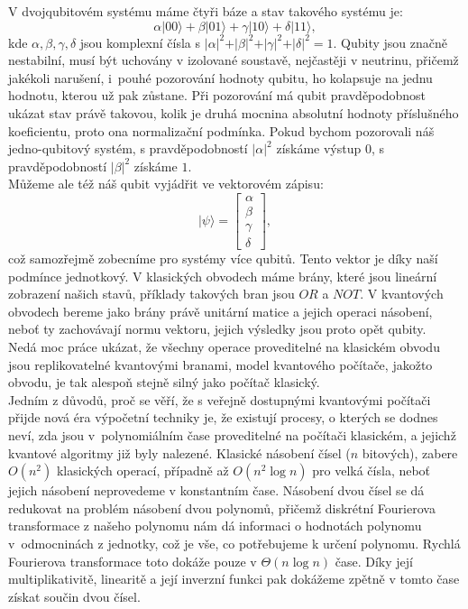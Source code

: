 \documentclass [12pt]{report}
\begin{document}
V dvojqubitovém systému máme čtyři báze a stav takového systému je:
\begin{equation*}
\alpha \vert 00 \rangle + \beta \vert 01 \rangle + \gamma \vert 10 \rangle + \delta \vert 11 \rangle, 
\end{equation*}
kde $\alpha,\beta,\gamma,\delta$ jsou komplexní čísla s $\vert \alpha \vert ^2 + \vert \beta \vert^2 + \vert \gamma \vert^2 + \vert \delta \vert^2 = 1$. Qubity jsou značně nestabilní, musí být uchovány v izolované soustavě, nejčastěji v neutrinu, přičemž jakékoli narušení, i~pouhé pozorování hodnoty qubitu, ho kolapsuje na jednu hodnotu, kterou už pak zůstane. Při pozorování má qubit pravděpodobnost ukázat stav právě takovou, kolik je druhá mocnina absolutní hodnoty příslušného koeficientu, proto ona normalizační podmínka. Pokud bychom pozorovali náš jedno-qubitový systém, s pravděpodobností $\vert \alpha \vert ^2$ získáme výstup $0$, s pravděpodobností $\vert \beta \vert ^2$ získáme $1$.\\

Můžeme ale též náš qubit vyjádřit ve vektorovém zápisu:
\begin{equation*}
\vert \psi \rangle = \begin{bmatrix}
\alpha \\
\beta \\
\gamma \\
\delta
\end{bmatrix},
\end{equation*}
což samozřejmě zobecníme pro systémy více qubitů. Tento vektor je díky naší podmínce jednotkový. V klasických obvodech máme brány, které jsou lineární zobrazení našich stavů, příklady takových bran jsou $OR$ a $NOT$. V kvantových obvodech bereme jako brány právě unitární matice a jejich operaci násobení, neboť ty zachovávají normu vektoru, jejich výsledky jsou proto opět qubity.\\

Nedá moc práce ukázat, že všechny operace proveditelné na klasickém obvodu jsou replikovatelné kvantovými branami, model kvantového počítače, jakožto obvodu, je tak alespoň stejně silný jako počítač klasický.\\

Jedním z důvodů, proč se věří, že s veřejně dostupnými kvantovými počítači přijde nová éra výpočetní techniky je, že existují procesy, o kterých se dodnes neví, zda jsou v~polynomiálním čase proveditelné na počítači klasickém, a jejichž kvantové algoritmy již byly nalezené. Klasické násobení čísel ($n$ bitových), zabere $O(n^2)$ klasických operací, případně až $O(n^2 \log n)$ pro velká čísla, neboť jejich násobení neprovedeme v konstantním čase. Násobení dvou čísel se dá redukovat na problém násobení dvou polynomů, přičemž diskrétní Fourierova transformace z našeho polynomu nám dá informaci o hodnotách polynomu v~odmocninách z jednotky, což je vše, co potřebujeme k určení polynomu. Rychlá Fourierova transformace toto dokáže pouze v $\Theta(n \log n)$ čase. Díky její multiplikativitě, linearitě a její inverzní funkci pak dokážeme zpětně v tomto čase získat součin dvou čísel.\\
\end{document}
